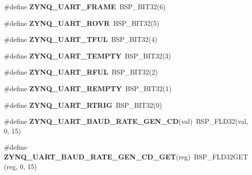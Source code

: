 \begin{DoxyCompactItemize}
\item 
\mbox{\label{zynq-uart-regs_8h_ac6d2da225a310823c51e46a7784be54d}} 
\#define {\bfseries Z\+Y\+N\+Q\+\_\+\+U\+A\+R\+T\+\_\+\+F\+R\+A\+ME}~B\+S\+P\+\_\+\+B\+I\+T32(6)
\item 
\mbox{\label{zynq-uart-regs_8h_a6844292f7aceeeb75c3744b610112261}} 
\#define {\bfseries Z\+Y\+N\+Q\+\_\+\+U\+A\+R\+T\+\_\+\+R\+O\+VR}~B\+S\+P\+\_\+\+B\+I\+T32(5)
\item 
\mbox{\label{zynq-uart-regs_8h_ac0674692f6e9714d773fa34282e8c7d4}} 
\#define {\bfseries Z\+Y\+N\+Q\+\_\+\+U\+A\+R\+T\+\_\+\+T\+F\+UL}~B\+S\+P\+\_\+\+B\+I\+T32(4)
\item 
\mbox{\label{zynq-uart-regs_8h_a32abb2d65ff9ed17df59ccfdf01ca5f5}} 
\#define {\bfseries Z\+Y\+N\+Q\+\_\+\+U\+A\+R\+T\+\_\+\+T\+E\+M\+P\+TY}~B\+S\+P\+\_\+\+B\+I\+T32(3)
\item 
\mbox{\label{zynq-uart-regs_8h_aa4ba9c048cb8b22c0aaaf7a1ffbcaf0b}} 
\#define {\bfseries Z\+Y\+N\+Q\+\_\+\+U\+A\+R\+T\+\_\+\+R\+F\+UL}~B\+S\+P\+\_\+\+B\+I\+T32(2)
\item 
\mbox{\label{zynq-uart-regs_8h_a8932fbabb1840bc48da1f7488b9de10d}} 
\#define {\bfseries Z\+Y\+N\+Q\+\_\+\+U\+A\+R\+T\+\_\+\+R\+E\+M\+P\+TY}~B\+S\+P\+\_\+\+B\+I\+T32(1)
\item 
\mbox{\label{zynq-uart-regs_8h_ace87deb19623bb296b6b42934ea9ce35}} 
\#define {\bfseries Z\+Y\+N\+Q\+\_\+\+U\+A\+R\+T\+\_\+\+R\+T\+R\+IG}~B\+S\+P\+\_\+\+B\+I\+T32(0)
\item 
\mbox{\label{zynq-uart-regs_8h_a0097f56e3700253036ca302062aec285}} 
\#define {\bfseries Z\+Y\+N\+Q\+\_\+\+U\+A\+R\+T\+\_\+\+B\+A\+U\+D\+\_\+\+R\+A\+T\+E\+\_\+\+G\+E\+N\+\_\+\+CD}(val)~B\+S\+P\+\_\+\+F\+L\+D32(val, 0, 15)
\item 
\mbox{\label{zynq-uart-regs_8h_a9ab99ccd33253e905a5f5113bfb79028}} 
\#define {\bfseries Z\+Y\+N\+Q\+\_\+\+U\+A\+R\+T\+\_\+\+B\+A\+U\+D\+\_\+\+R\+A\+T\+E\+\_\+\+G\+E\+N\+\_\+\+C\+D\+\_\+\+G\+ET}(reg)~B\+S\+P\+\_\+\+F\+L\+D32\+G\+ET(reg, 0, 15)

\end{DoxyCompactItemize}
